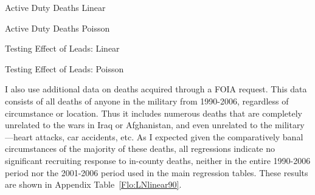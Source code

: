 \documentclass[12pt] {article}
\begin{document}
\pagebreak{}
\clearpage{}
\begin{table}
\caption{Active Duty Deaths Linear}
\label{Flo:Rdeathslinear}
\scalebox{0.9}{

}
\end{table}


\begin{table}
\caption{Active Duty Deaths Poisson}
\label{Flo:RdeathsP} 
\scalebox{0.85}{}
\end{table}



\clearpage{}
\begin{table}
\caption{Testing Effect of Leads: Linear}
\label{Flo:forwardbasicLN}
\scalebox{0.8}{
}
\end{table}

\pagebreak{}
\clearpage{}
\begin{table}
\caption{Testing Effect of Leads: Poisson}
\label{Flo:forwardPbasic}
\scalebox{0.9}{
}
\end{table}


I also use additional data on deaths acquired through a FOIA request. This data consists of all deaths of anyone in the military from 1990-2006, regardless of circumstance or location. Thus it includes numerous deaths that are completely unrelated to the wars in Iraq or Afghanistan, and even unrelated to the military---heart attacks, car accidents, etc. As I expected given the comparatively banal circumstances of the majority of these deaths, all regressions indicate no significant recruiting response to in-county deaths, neither in the entire 1990-2006 period nor the 2001-2006 period used in the main regression tables. These results are shown in Appendix Table~\ref{Flo:LNlinear90}.%

\begin{table}
\caption{}
\label{Flo:LNlinear90}
\scalebox{0.8}{
}
\end{table}

\end{document}
